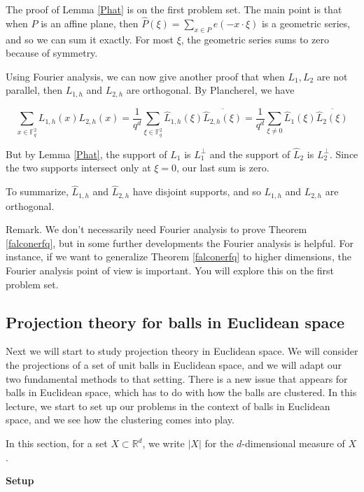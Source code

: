 \documentclass[12pt]{amsart}
\newcommand{\FF}{\mathbb{F}}
\newcommand{\RR}{\mathbb{R}}
\begin{document}
The proof of Lemma \ref{Phat} is on the first problem set.  The main point is that when $P$ is an affine plane, then $\hat P(\xi) = \sum_{x \in P} e(- x \cdot \xi)$ is a geometric series, and so we can sum it exactly.  For most $\xi$, the geometric series sums to zero because of symmetry.

Using Fourier analysis, we can now give another proof that when $L_1, L_2$ are not parallel, then $L_{1,h}$ and $L_{2,h}$ are orthogonal.  By Plancherel, we have

$$ \sum_{x \in \FF_q^2} L_{1,h}(x) L_{2,h}(x) = \frac{1}{q^d} \sum_{\xi \in \FF_q^2} \hat L_{1,h}(\xi) \overline{ \hat L_{2,h}(\xi)} =\frac{1}{q^d} \sum_{\xi \not= 0} \hat L_{1}(\xi) \overline{ \hat L_{2}(\xi)} $$

But by Lemma \ref{Phat}, the support of $\hat L_1$ is $L_1^\perp$ and the support of $\hat L_2$ is $L_2^\perp$.  Since the two supports intersect only at $\xi=0$, our last sum is zero.

To summarize, $\hat L_{1,h}$ and $\hat L_{2,h}$ have disjoint supports, and so $L_{1,h}$ and $L_{2,h}$ are orthogonal.

Remark. We don't necessarily need Fourier analysis to prove Theorem \ref{falconerfq}, but in some further developments the Fourier analysis is helpful.  For instance, if we want to generalize Theorem \ref{falconerfq} to higher dimensions, the Fourier analysis point of view is important.  You will explore this on the first problem set.

\subsection{Projection theory for balls in Euclidean space}

Next we will start to study projection theory in Euclidean space.  We will consider the projections of a set of unit balls in Euclidean space, and we will adapt our two fundamental methods to that setting.  There is a new issue that appears for balls in Euclidean space, which has to do with how the balls are clustered.  In this lecture, we start to set up our problems in the context of balls in Euclidean space, and we see how the clustering comes into play.

\vskip10pt

In this section, for a set $X \subset \RR^d$, we write $|X|$ for the $d$-dimensional measure of $X$.

\vskip10pt

{\bf Setup}
\end{document}
